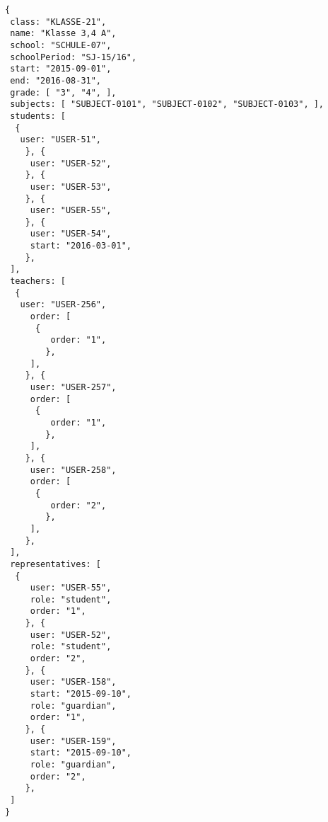 
\begin{lstlisting}[caption={Klassen-Datenmodell Beispiel 3: Jahrgangsübergreifende Klasse},frame=tlrb]
{
 class: "KLASSE-21",
 name: "Klasse 3,4 A",
 school: "SCHULE-07",
 schoolPeriod: "SJ-15/16",
 start: "2015-09-01",
 end: "2016-08-31",
 grade: [ "3", "4", ],
 subjects: [ "SUBJECT-0101", "SUBJECT-0102", "SUBJECT-0103", ],
 students: [
  { 
   user: "USER-51",
	}, { 
	 user: "USER-52",
	}, { 
	 user: "USER-53",
	}, { 
	 user: "USER-55",
	}, { 
	 user: "USER-54",
	 start: "2016-03-01",
	},
 ],
 teachers: [
  { 
   user: "USER-256",
	 order: [
	  {
		 order: "1",
		},
	 ],
	}, { 
	 user: "USER-257",
	 order: [
	  {
		 order: "1",
		},
	 ],
	}, { 
	 user: "USER-258",
	 order: [
	  {
		 order: "2",
		},
	 ],
	},
 ],
 representatives: [
  {
	 user: "USER-55",
	 role: "student",
	 order: "1",	 
	}, {
	 user: "USER-52",
	 role: "student",
	 order: "2",	 
	}, {
	 user: "USER-158",
	 start: "2015-09-10",
	 role: "guardian",
	 order: "1",	 
	}, {
	 user: "USER-159",
	 start: "2015-09-10",
	 role: "guardian",
	 order: "2",	 
	},  
 ]
}
\end{lstlisting}
